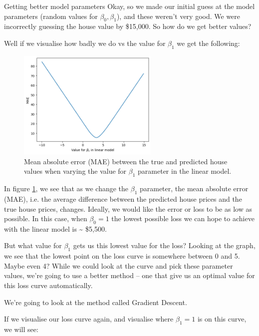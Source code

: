 \documentclass[10pt]{beamer}
\begin{document}
\begin{frame}[fragile,allowframebreaks,label=]{Getting better model parameters}
Okay, so we made our initial guess at the model parameters (random values for \(\beta_0,
\beta_1\)), and these weren't very good. We were incorrectly guessing the house value by
\$15,000. So how do we get better values?

Well if we visualise how badly we do vs the value for \(\beta_1\) we get the following:

\begin{figure}[htbp]
\centering
\includegraphics[width=0.6\textwidth]{images/plot_linear_model_loss_w.png}
\caption{\label{fig:mae_lm}Mean absolute error (MAE) between the true and predicted house values when varying the value for \(\beta_1\) parameter in the linear model.}
\end{figure}

In figure \ref{fig:mae_lm}, we see that as we change the \(\beta_1\) parameter, the mean absolute
error (MAE), i.e. the average difference between the predicted house prices and the
true house prices, changes. Ideally, we would like the error or \alert{loss} to be as low as
possible. In this case, when \(\beta_0 = 1\) the lowest possible loss we can hope to achieve
with the linear model is \textasciitilde{} \$5,500.

But what value for \(\beta_1\) gets us this lowest value for the loss? Looking at the graph,
we see that the lowest point on the loss curve is somewhere between 0 and 5. Maybe
even 4? While we could look at the curve and pick these parameter values, we're going
to use a better method -- one that give us an optimal value for this loss curve
automatically.

We're going to look at the method called \alert{Gradient Descent}.

If we visualise our loss curve again, and visualise where \(\beta_1 = 1\) is on this curve,
we will see:


\end{frame}
\end{document}
